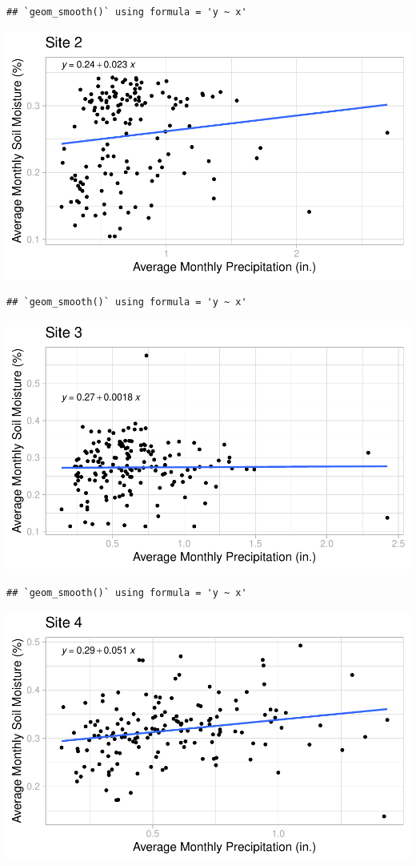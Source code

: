 \documentclass[
  12pt,
]{article}
\begin{document}
\begin{verbatim}
## `geom_smooth()` using formula = 'y ~ x'
\end{verbatim}

\includegraphics{Project_Template_files/figure-latex/Average Monthly Soil Moisture and Precipitation Plots-2.pdf}

\begin{verbatim}
## `geom_smooth()` using formula = 'y ~ x'
\end{verbatim}

\includegraphics{Project_Template_files/figure-latex/Average Monthly Soil Moisture and Precipitation Plots-3.pdf}

\begin{verbatim}
## `geom_smooth()` using formula = 'y ~ x'
\end{verbatim}

\includegraphics{Project_Template_files/figure-latex/Average Monthly Soil Moisture and Precipitation Plots-4.pdf}
\end{document}
